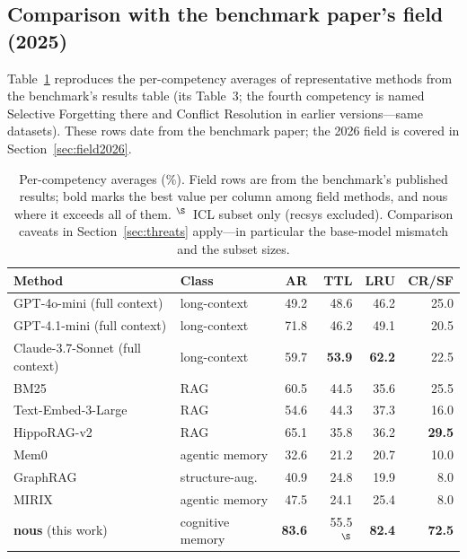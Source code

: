 \documentclass{article}
\newcommand{\nous}{\textsf{nous}}
\begin{document}
\subsection{Comparison with the benchmark paper's field (2025)}

Table~\ref{tab:field} reproduces the per-competency averages of representative
methods from the benchmark's results table (its Table~3; the fourth competency
is named Selective Forgetting there and Conflict Resolution in earlier
versions---same datasets). These rows date from the benchmark paper; the 2026
field is covered in Section~\ref{sec:field2026}.

\begin{table}[h]
\centering
\begin{tabular}{llrrrr}
\toprule
Method & Class & AR & TTL & LRU & CR/SF \\
\midrule
GPT-4o-mini (full context) & long-context & 49.2 & 48.6 & 46.2 & 25.0 \\
GPT-4.1-mini (full context) & long-context & 71.8 & 46.2 & 49.1 & 20.5 \\
Claude-3.7-Sonnet (full context) & long-context & 59.7 & \textbf{53.9} & \textbf{62.2} & 22.5 \\
BM25 & RAG & 60.5 & 44.5 & 35.6 & 25.5 \\
Text-Embed-3-Large & RAG & 54.6 & 44.3 & 37.3 & 16.0 \\
HippoRAG-v2 & RAG & 65.1 & 35.8 & 36.2 & \textbf{29.5} \\
Mem0 & agentic memory & 32.6 & 21.2 & 20.7 & 10.0 \\
GraphRAG & structure-aug. & 40.9 & 24.8 & 19.9 & 8.0 \\
MIRIX & agentic memory & 47.5 & 24.1 & 25.4 & 8.0 \\
\midrule
\textbf{\nous{}} (this work) & cognitive memory & \textbf{83.6} & 55.5$^{\S}$ & \textbf{82.4} & \textbf{72.5} \\
\bottomrule
\end{tabular}
\caption{Per-competency averages (\%). Field rows are from the benchmark's
published results; bold marks the best value per column among field methods,
and \nous{} where it exceeds all of them. $^{\S}$~ICL subset only (recsys
excluded). Comparison caveats in
Section~\ref{sec:threats} apply---in particular the base-model mismatch and
the subset sizes.}
\label{tab:field}
\end{table}
\end{document}
